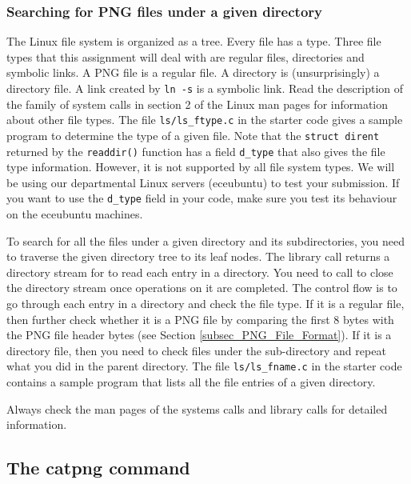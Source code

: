 \subsubsection{Searching for PNG files under a given directory}
The Linux file system is organized as a tree. Every file has a type. Three file types that this assignment will deal with are regular files, directories and symbolic links.  A PNG file is a regular file. A directory is (unsurprisingly) a directory file. A link created by \verb+ln -s+ is a symbolic link. Read the description of the  family of system calls in section 2 of the Linux man pages for information about other file types. The file \verb+ls/ls_ftype.c+ in the starter code gives a sample program to determine the type of a given file. Note that the \verb+struct dirent+ returned by the \verb+readdir()+ function has a field \verb+d_type+ that also gives the file type information. However, it is not supported by all file system types. We will be using our departmental Linux servers (eceubuntu) to test your submission. If you want to use the \verb+d_type+ field in your code, make sure you test its behaviour on the eceubuntu machines.

To search for all the files under a given directory and its subdirectories, you need to traverse the given directory tree to its leaf nodes.  The library call  returns a directory stream for  to read each entry in a directory. You need to call  to close the directory stream once operations on it are completed. The control flow is to go through each entry in a directory and check the file type. If it is a regular file, then further check whether it is a PNG file by comparing the first 8 bytes with the PNG file header bytes (see Section \ref{subsec_PNG_File_Format}). If it is a directory file, then you need to check files under the sub-directory and repeat what you did in the parent directory.
The file \verb+ls/ls_fname.c+ in the starter code contains a sample program that lists all the file entries of a given directory.

Always check the man pages of the systems calls and library calls for detailed information.


\subsection{The catpng command}

